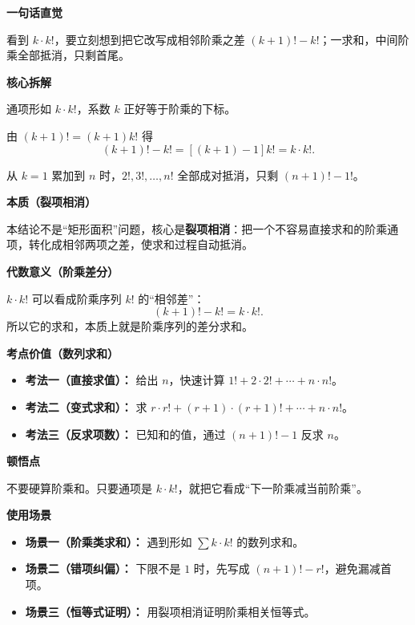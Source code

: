 \begin{explanationbox}
\textbf{\textcolor{CExplanation}{一句话直觉}}

看到 $k\cdot k!$，要立刻想到把它改写成相邻阶乘之差 $(k+1)!-k!$；一求和，中间阶乘全部抵消，只剩首尾。

\medskip
\textbf{\textcolor{CExplanation}{核心拆解}}
\begin{description}[style=nextline, leftmargin=2.8em, labelsep=0.5em, itemsep=0.45em]
    \item[\textbf{要点一（识别通项）：}] 通项形如 $k\cdot k!$，系数 $k$ 正好等于阶乘的下标。
    \item[\textbf{要点二（裂项公式）：}] 由 $(k+1)!=(k+1)k!$ 得
    \[
    (k+1)!-k!=[(k+1)-1]k!=k\cdot k!.
    \]
    \item[\textbf{要点三（首尾保留）：}] 从 $k=1$ 累加到 $n$ 时，$2!,3!,\dots,n!$ 全部成对抵消，只剩 $(n+1)!-1!$。
\end{description}

\medskip
\textbf{\textcolor{CExplanation}{本质（裂项相消）}}

本结论不是“矩形面积”问题，核心是\textbf{裂项相消}：把一个不容易直接求和的阶乘通项，转化成相邻两项之差，使求和过程自动抵消。

\medskip
\textbf{\textcolor{CExplanation}{代数意义（阶乘差分）}}

$k\cdot k!$ 可以看成阶乘序列 $k!$ 的“相邻差”：
\[
(k+1)!-k!=k\cdot k!.
\]
所以它的求和，本质上就是阶乘序列的差分求和。

\medskip
\textbf{\textcolor{CExplanation}{考点价值（数列求和）}}
\begin{itemize}[leftmargin=*, itemsep=0.5em, topsep=0.4em]
    \item \textbf{考法一（直接求值）：} 给出 $n$，快速计算 $1!+2\cdot2!+\cdots+n\cdot n!$。
    \item \textbf{考法二（变式求和）：} 求 $r\cdot r!+(r+1)\cdot(r+1)!+\cdots+n\cdot n!$。
    \item \textbf{考法三（反求项数）：} 已知和的值，通过 $(n+1)!-1$ 反求 $n$。
\end{itemize}

\medskip
\textbf{\textcolor{CExplanation}{顿悟点}}

不要硬算阶乘和。只要通项是 $k\cdot k!$，就把它看成“下一阶乘减当前阶乘”。

\medskip
\textbf{\textcolor{CExplanation}{使用场景}}
\begin{itemize}[leftmargin=*, itemsep=0.5em, topsep=0.4em]
    \item \textbf{场景一（阶乘类求和）：} 遇到形如 $\sum k\cdot k!$ 的数列求和。
    \item \textbf{场景二（错项纠偏）：} 下限不是 $1$ 时，先写成 $(n+1)!-r!$，避免漏减首项。
    \item \textbf{场景三（恒等式证明）：} 用裂项相消证明阶乘相关恒等式。
\end{itemize}
\end{explanationbox}
